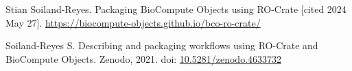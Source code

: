 \documentclass[10pt,letterpaper]{article}
\begin{document}
\begin{thebibliography}{10}
\begin{small}
Stian Soiland-Reyes. Packaging BioCompute Objects using RO-Crate [cited 2024 May 27].
\url{https://biocompute-objects.github.io/bco-ro-crate/}

Soiland-Reyes S.
Describing and packaging workflows using RO-Crate and BioCompute Objects.
Zenodo, 2021.
doi: \href{https://doi.org/10.5281/zenodo.4633732}{10.5281/zenodo.4633732}










\end{small}


\end{thebibliography}
\end{document}
